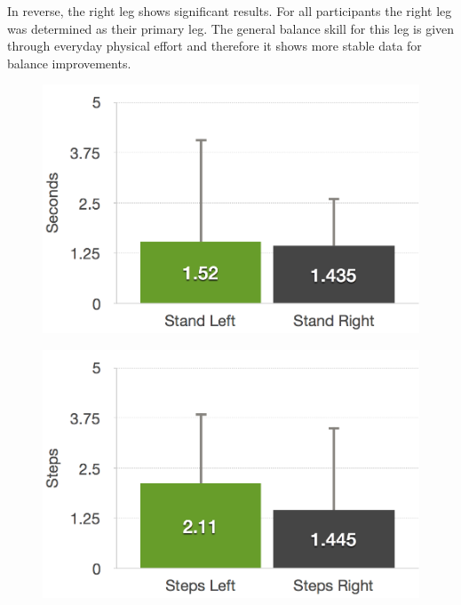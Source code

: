 In reverse, the right leg shows significant results.
For all participants the right leg was determined as their primary leg.
The general balance skill for this leg is given through everyday physical effort and therefore it shows more stable data for balance improvements.

\begin{figure}[htb]
	\centering
	\begin{minipage}[t]{0.32\linewidth}
		\centering
		\includegraphics[width=1\linewidth]{Pictures/6_4_DIA_StandAllDiff}
		\label{fig:6_4_standAllDiff}
	\end{minipage}
	\hfill
	\begin{minipage}[t]{0.32\linewidth}
		\centering
		\includegraphics[width=1\linewidth]{Pictures/6_4_DIA_StepsAllDiff}
		\label{fig:6_4_stepsAllDiff}
	\end{minipage}

\end{figure}
